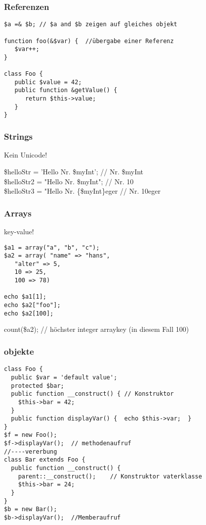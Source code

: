  \subsubsection{Referenzen}
\begin{verbatim}
$a =& $b; // $a and $b zeigen auf gleiches objekt

function foo(&$var) {  //übergabe einer Referenz
   $var++;
}

class Foo {
   public $value = 42;
   public function &getValue() {
      return $this->value;
   }
}
\end{verbatim}
\subsubsection{Strings}
Kein Unicode!

\$helloStr = 'Hello Nr. \$myInt';  // Nr. \$myInt\\
\$helloStr2 = "Hello Nr. \$myInt";  // Nr. 10\\
\$helloStr3 = "Hello Nr. \{\$myInt\}eger // Nr. 10eger 
\subsubsection{Arrays}
key-value!
\begin{verbatim}
$a1 = array("a", "b", "c");
$a2 = array( "name" => "hans",
   "alter" => 5,
   10 => 25,
   100 => 78)

echo $a1[1];
echo $a2["foo"];
echo $a2[100];
\end{verbatim}

count(\$a2); // höchster integer arraykey (in diesem Fall 100)

\subsubsection{objekte}
\begin{verbatim}
class Foo {
  public $var = 'default value';
  protected $bar;
  public function __construct() { // Konstruktor
    $this->bar = 42;
  }
  public function displayVar() {  echo $this->var;  }
}
$f = new Foo();
$f->displayVar();  // methodenaufruf
//----vererbung
class Bar extends Foo {
  public function __construct() {
    parent::__construct();    // Konstruktor vaterklasse
    $this->bar = 24;
  }
}
$b = new Bar();
$b->displayVar();  //Memberaufruf
\end{verbatim}

